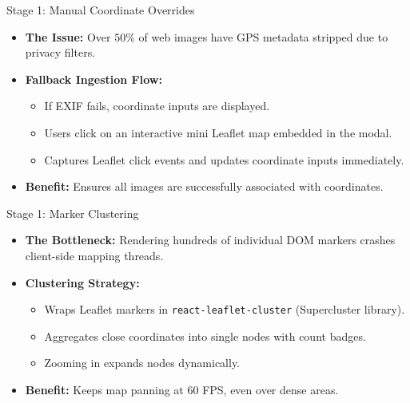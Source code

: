 \documentclass[aspectratio=169]{beamer}
\begin{document}
\begin{frame}{Stage 1: Manual Coordinate Overrides}
  \begin{itemize}
    \item \textbf{The Issue:} Over $50\%$ of web images have GPS metadata stripped due to privacy filters.
    \item \textbf{Fallback Ingestion Flow:}
      \begin{itemize}
        \item If EXIF fails, coordinate inputs are displayed.
        \item Users click on an interactive mini Leaflet map embedded in the modal.
        \item Captures Leaflet click events and updates coordinate inputs immediately.
      \end{itemize}
    \item \textbf{Benefit:} Ensures all images are successfully associated with coordinates.
  \end{itemize}
\end{frame}

\begin{frame}{Stage 1: Marker Clustering}
  \begin{itemize}
    \item \textbf{The Bottleneck:} Rendering hundreds of individual DOM markers crashes client-side mapping threads.
    \item \textbf{Clustering Strategy:}
      \begin{itemize}
        \item Wraps Leaflet markers in \texttt{react-leaflet-cluster} (Supercluster library).
        \item Aggregates close coordinates into single nodes with count badges.
        \item Zooming in expands nodes dynamically.
      \end{itemize}
    \item \textbf{Benefit:} Keeps map panning at 60 FPS, even over dense areas.
  \end{itemize}
\end{frame}
\end{document}

